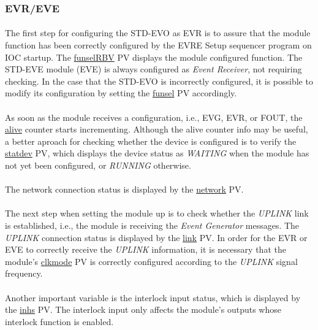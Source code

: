 \documentclass[openany]{article}
\begin{document}
		\subsubsection{EVR/EVE}

			\paragraph{} The first step for configuring the STD-EVO as EVR is to assure that the module function has been correctly configured by the EVRE Setup sequencer program on IOC startup. The \hyperref[pvgroup:evr-configuration]{funselRBV} PV displays the module configured function. The STD-EVE module (EVE) is always configured as \emph{Event Receiver}, not requiring checking. In the case that the STD-EVO is incorrectly configured, it is possible to modify its configuration by setting the \hyperref[pvgroup:evr-configuration]{funsel} PV accordingly.
			\paragraph{} As soon as the module receives a configuration, i.e., EVG, EVR, or FOUT, the \hyperref[pvgroup:evre-configuration]{alive} counter starts incrementing. Although the alive counter info may be useful, a better aproach for checking whether the device is configured is to verify the \hyperref[pvgroup:evre-module-support]{statdev} PV, which displays the device status as \emph{WAITING} when the module has not yet been configured, or \emph{RUNNING} otherwise.
			\paragraph{} The network connection status is displayed by the \hyperref[pvgroup:evre-module-support]{network} PV.
			\paragraph{} The next step when setting the module up is to check whether the \emph{UPLINK} link is established, i.e., the module is receiving the \emph{Event Generator} messages. The \emph{UPLINK} connection status is displayed by the \hyperref[pvgroup:evre-control-status]{link} PV. In order for the EVR or EVE to correctly receive the \emph{UPLINK} information, it is necessary that the module's \hyperref[pvgroup:evr-configuration]{clkmode} PV is correctly configured according to the \emph{UPLINK} signal frequency.
			\paragraph{} Another important variable is the interlock input status, which is displayed by the \hyperref[pvgroup:evre-control-status]{inhs} PV. The interlock input only affects the module's outputs whose interlock function is enabled.
\end{document}
